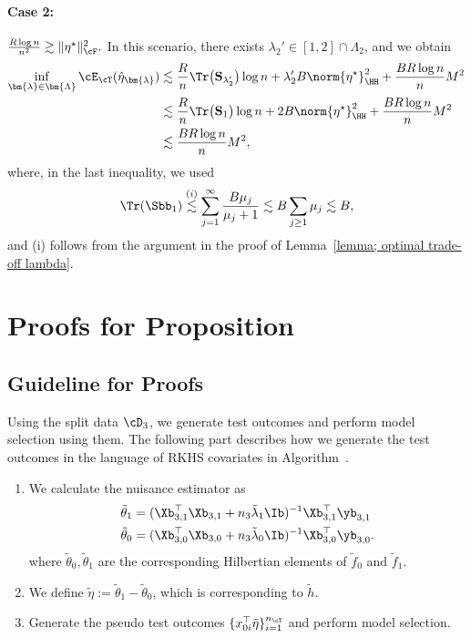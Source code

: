\documentclass[12pt,a4paper,pdftex,onepage]{article}
\newcommand{\Sbar}{\mathbf{S}}
\begin{document}
\paragraph{Case 2:} \(\frac{R\log n}{n^2} \gtrsim\|\eta^\star\|^2_\cF.\)
In this scenario, there exists \(\lambda_2' \in [1,2] \cap \Lambda_2\), and we obtain
\begin{align*}
\inf_{\bm{\lambda} \in \bm{\Lambda}} \cE_{\cT}(\hat{\eta}_{\bm{\lambda}})  
&\lesssim \frac{R}{n}\Tr\bigl(\Sbar_{\lambda_2'}\bigr)\log n 
+  \lambda_2' B \norm{\eta^\star}^2_\HH 
+\frac{BR\log n}{n}M^2 \\ 
&\lesssim \frac{R}{n}\Tr\bigl(\Sbar_{1}\bigr)\log n 
+  2 B \norm{\eta^\star}^2_\HH 
+\frac{BR\log n}{n}M^2 \\  
&\lesssim \frac{BR\log n}{n}M^2,
\end{align*}
where, in the last inequality, we used
\begin{align*}
    \Tr(\Sbb_{1}) \stackrel{(i)}{\lesssim} \sum_{j=1}^\infty \frac{B\mu_j}{\mu_j + 1} \lesssim B \sum_{j \ge 1} \mu_j \lesssim B,
\end{align*}
and (i) follows from the argument in the proof of Lemma~\ref{lemma; optimal trade-off lambda}.


\section{Proofs for Proposition~}\label{section; proofs oracle inequalities}


\subsection{Guideline for Proofs}

Using the split data $\cD_3$, we generate test outcomes and perform model selection using them.
The following part describes how we generate the test outcomes in the language of RKHS covariates in Algorithm~.

\begin{enumerate}\label{equation; model selection nuisance estimator}
\item We calculate the nuisance estimator as 
\begin{align*}
&\tilde{\theta}_1 = (\Xb_{3,1}^\top \Xb_{3,1}+n_3\tilde{\lambda}_1\Ib)^{-1}\Xb_{3,1}^\top \yb_{3,1}\\
&\tilde{\theta}_0 = (\Xb_{3,0}^\top \Xb_{3,0}+n_3\tilde{\lambda}_0\Ib)^{-1}\Xb_{3,0}^\top \yb_{3,0}.
\end{align*}
where $\tilde{\theta}_0, \tilde{\theta}_1$ are the corresponding Hilbertian elements of $\tilde{f}_0$ and $\tilde{f}_1$.
\item We define \(\tilde{\eta}:= \tilde{\theta}_1 - \tilde{\theta}_0\), which is corresponding to $\tilde{h}$.
\item Generate the pseudo test outcomes \(\{ x_{0i}^\top \tilde{\eta}\}_{i=1}^{n_{\cT}}\) and perform model selection.
\end{enumerate}
\end{document}
